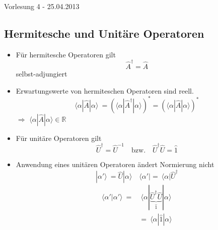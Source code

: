 \documentclass[10pt,article,colorback,accentcolor=tud9d]{scrartcl}
\begin{document}
\begin{flushright}
Vorlesung 4 - 25.04.2013
\end{flushright}

\subsection{Hermitesche und Unitäre Operatoren}
\begin{itemize}
  \item Für hermitesche Operatoren gilt
    \begin{equation}
    \hat{A}^{\dagger}=\hat{A}
    \end{equation}
    selbst-adjungiert
  \item Erwartungswerte von hermiteschen Operatoren sind reell.
    \begin{equation}
    \langle \alpha|\hat{A}|\alpha\rangle  \ =  \left(\langle \alpha | \hat{A}^{\dagger} | \alpha \rangle \right)^* = \left(\langle \alpha |\hat{A}|\alpha\rangle \right)^*
    \end{equation}
    $\Rightarrow$ $\langle \alpha|\hat{A}|\alpha\rangle  \in \mathbb{R}$
  \item Für unitäre Operatoren gilt
    \begin{equation}
    \hat{U}^{\dagger}=\hat{U}^{-1} \quad \text{bzw.} \quad \hat{U}^{\dagger}\hat{U}=\hat{1}
    \end{equation}
  \item Anwendung eines unitären Operatoren ändert Normierung nicht
    \begin{equation} \nonumber
     |\alpha'\rangle  \ = \hat{U}|\alpha\rangle  \quad \langle \alpha'|= \ \langle \alpha|\hat{U}^{\dagger}
    \end{equation}
    \begin{equation}
    \begin{aligned}
    \langle \alpha'|\alpha'\rangle  \ =& \ \langle \alpha|\underbrace{\hat{U}^{\dagger}\hat{U}}_{\hat{1}}|\alpha\rangle \\
    &= \ \langle \alpha|\hat{1}|\alpha\rangle 
    \end{aligned}
    \end{equation}
    \end{itemize}
\end{document}
